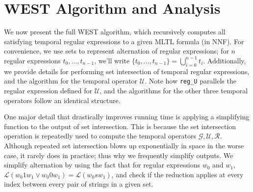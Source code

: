 \documentclass[runningheads]{llncs}
\renewcommand{\phi}{\varphi}
\begin{document}

\section{WEST Algorithm and Analysis} \label{WESTalg}
We now present the  full WEST algorithm, which recursively computes all satisfying temporal regular expressions to a given MLTL formula (in NNF). 
For convenience, we use sets to represent alternation of regular expressions; for $n$ regular expressions $t_0, ..., t_{n-1}$, we'll write $\{t_0, ..., t_{n-1}\} = \bigcup_{i=0}^{n-1} t_i$. 
Additionally, we provide details for performing set intersection of temporal regular expressions, and the algorithm for the temporal operator $\mathcal{U}$. 
Note how \texttt{reg\_U} parallels the regular expression defined for $\mathcal{U}$, and the algorithms for the other three temporal operators follow an identical structure. 

One major detail that drastically improves running time is applying a simplifying function to the output of set intersection. 
This is because the set intersection operation is repeatedly used to compute the temporal operators $\mathcal{G}, \mathcal{U}, \mathcal{R}$. 
Although repeated set intersection blows up exponentially in space in the worse case, it rarely does in practice; thus why we frequently simplify outputs. 
We simplify alternation by using the fact that for regular expressions $w_0$ and $w_1$, $\mathscr{L}(w_0 1 w_1 \lor w_0 0 w_1) = \mathscr{L}(w_0 s w_1)$, and check if the reduction applies at every index between every pair of strings in a given set. 

        



\end{document}
